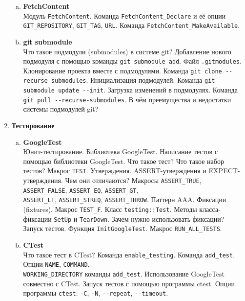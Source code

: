 \documentclass{article}
\begin{document}
\begin{enumerate}
\begin{enumerate}[a.]
\item \textbf{FetchContent}\\
Модуль \texttt{FetchContent}.
Команда \texttt{FetchContent\_Declare} и её опции \texttt{GIT\_REPOSITORY}, \texttt{GIT\_TAG}, \texttt{URL}.
Команда \texttt{FetchContent\_MakeAvailable}.

\item \textbf{git submodule}\\
Что такое подмодули (submodules) в системе git? Добавление нового подмодуля с помощью команды \texttt{git submodule add}. 
Файл \texttt{.gitmodules}. 
Клонирование проекта вместе с подмодулями. Команда \texttt{git clone -{}-recurse-submodules}.
Инициализация подмодулей. Команда \texttt{git submodule update -{}-init}.
Загрузка изменений в подмодулях. Команда \texttt{git pull -{}-recurse-submodules}.
В чём преемущества и недостатки системы подмодулей git?
\end{enumerate}


\item \textbf{Тестирование}
\begin{enumerate}[a.]
\item \textbf{GoogleTest}\\
Юнит-тестирование. Библиотека GoogleTest. Написание тестов с помощью библиотеки GoogleTest.
Что такое тест? Что такое набор тестов? Макрос \texttt{TEST}. Утверждения. ASSERT-утверждения и EXPECT-утверждения. Чем они отличаются? Макросы \texttt{ASSERT\_TRUE}, \texttt{ASSERT\_FALSE}, \texttt{ASSERT\_EQ}, \texttt{ASSERT\_GT},\\ \texttt{ASSERT\_LT}, \texttt{ASSERT\_STREQ}, \texttt{ASSERT\_THROW}. Паттерн AAA. Фиксации (fixtures). Макрос \texttt{TEST\_F}. Класс \texttt{testing::Test}. Методы класса-фиксации \texttt{SetUp} и \texttt{TearDown}. Зачем нужно использовать фиксации? Запуск тестов. Функция \texttt{InitGoogleTest}. Макрос \texttt{RUN\_ALL\_TESTS}.
\item \textbf{CTest}\\
Что такое тест в CTest? Команда \texttt{enable\_testing}. Команда \texttt{add\_test}. Опции \texttt{NAME}, \texttt{COMMAND},\\ \texttt{WORKING\_DIRECTORY} команды \texttt{add\_test}.
Использование GoogleTest совместно с CTest. 
Запуск тестов с помощью программы ctest.
Опции программы \texttt{ctest}: \texttt{-C}, \texttt{-N}, \texttt{-{}-repeat}, \texttt{-{}-timeout}.

\end{enumerate}




\end{enumerate}
\end{document}
